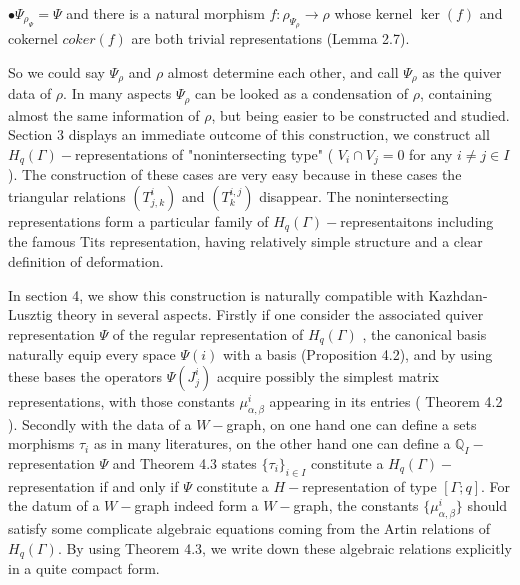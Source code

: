 \def\CTEXPreproc{Created by ctex v0.2.12, don't edit!}\documentclass[11pt]{article}
\begin{document}
 \noindent $\bullet$$\Psi_{\rho_{\Psi}} = \Psi  $ and there is a natural
 morphism $f: \rho_{\Psi_{\rho}} \rightarrow \rho$ whose kernel $\ker(f)$ and cokernel $coker(f)$ are both trivial representations (Lemma 2.7).

 So we could say $\Psi_{\rho}$ and $\rho$ almost determine each other, and call $\Psi_{\rho}$ as the quiver data of $\rho$. In many aspects $\Psi_{\rho}$ can be looked as a condensation of $\rho$, containing almost the same information of $\rho$, but being easier to be constructed and studied. Section 3 displays an immediate outcome of this construction, we construct all $H_q (\Gamma)-$representations of "nonintersecting type" ( $V_i \cap V_j =0 $ for any $i\neq j \in I$   ). The construction of these cases are very easy because in these cases the triangular relations $(T^{i}_{j,k})$ and $(T^{i,j}_k )$ disappear. The nonintersecting representations form a particular family of $H_q (\Gamma)-$representaitons including the famous Tits representation, having relatively simple structure and a clear definition of deformation.

  In section 4, we  show this construction is naturally compatible with Kazhdan-Lusztig theory in several aspects. Firstly if one consider the associated quiver representation $\Psi$ of the regular representation of $H_q (\Gamma)$ , the canonical basis naturally equip every space $\Psi (i)$ with a basis (Proposition 4.2), and by using these bases the operators $\Psi ( J^i _j )$ acquire possibly the simplest matrix representations,  with those constants $\mu ^i _{\alpha ,\beta}$ appearing in its entries ( Theorem 4.2 ). Secondly with the data of a $W-$graph, on one hand one can define a sets morphisms $\tau_i $ as in many literatures, on the other hand  one can define a $\mathbb{Q}_I -$representation $\Psi$ and Theorem 4.3 states $\{ \tau_i \} _{i\in I}$ constitute a $H_q (\Gamma)-$representation if and only if $\Psi$ constitute a $H-$representation of type $[\Gamma ;q]$. For the datum of a $W-$graph indeed form a $W-$graph, the constants
   $\{ \mu^i _{\alpha ,\beta} \}$ should satisfy some complicate algebraic equations coming from the Artin relations of $H_q (\Gamma)$. By using Theorem 4.3, we write down these algebraic relations explicitly in a quite compact form.
\end{document}
